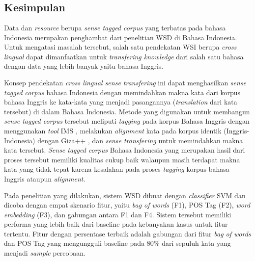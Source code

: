 \chapter{\babEnam}

\section{Kesimpulan}

Data dan \textit{resource} berupa \textit{sense tagged corpus} yang terbatas pada bahasa Indonesia merupakan penghambat dari penelitian WSD di Bahasa Indonesia. Untuk mengatasi masalah tersebut, salah satu pendekatan WSI berupa \textit{cross lingual} dapat dimanfaatkan untuk \textit{transfering knowledge} dari salah satu bahasa dengan data yang lebih banyak yaitu bahasa Inggris.

Konsep pendekatan \textit{cross lingual sense transfering} ini dapat menghasilkan \textit{sense tagged corpus} bahasa Indonesia dengan memindahkan makna kata dari korpus bahasa Inggris ke kata-kata yang menjadi pasangannya (\textit{translation} dari kata tersebut) di dalam Bahasa Indonesia. Metode yang digunakan untuk membangun \textit{sense tagged corpus} tersebut meliputi \textit{tagging} pada korpus Bahasa Inggris dengan menggunakan \textit{tool} IMS \citep{zhong2010makes}, melakukan \textit{alignment} kata pada korpus identik (Inggris-Indonesia) dengan Giza++ \citep{och03:asc}, dan \textit{sense transfering} untuk memindahkan makna kata tersebut. \textit{Sense tagged corpus} Bahasa Indonesia  yang merupakan hasil dari proses tersebut memiliki kualitas cukup baik walaupun masih terdapat makna kata yang tidak tepat karena kesalahan pada proses \textit{tagging} korpus bahasa Inggris ataupun \textit{alignment}.

Pada penelitian yang dilakukan, sistem WSD dibuat dengan \textit{classifier} SVM dan dicoba dengan empat skenario fitur, yaitu \textit{bag of words} (F1), POS Tag (F2), \textit{word embedding} (F3), dan gabungan antara F1 dan F4. Sistem tersebut  memiliki performa yang lebih baik dari baseline pada kebanyakan kasus untuk fitur tertentu. Fitur dengan persentase terbaik adalah gabungan dari fitur \textit{bag of words} dan POS Tag yang mengungguli baseline pada 80\% dari sepuluh kata yang menjadi \textit{sample} percobaan.
